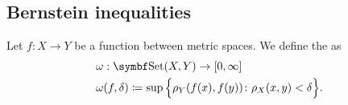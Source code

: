 \subsection{Bernstein inequalities}\label{subsec:bernstein_inequalities}

\begin{definition}\label{def:modulus_of_continuity}\cite[27]{Николов2020}
  Let \( f: X \to Y \) be a function between metric spaces. We define the  as
  \begin{align*}
    &\omega: \Cat{Set}(X, Y) \to [0, \infty] \\
    &\omega(f, \delta) \coloneqq \sup \Big\{ \rho_Y(f(x), f(y)) \colon \rho_X(x, y) < \delta \Big\}.
  \end{align*}
\end{definition}

